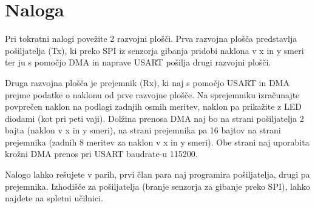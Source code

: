 \documentclass[12pt,letterpaper]{article}
\begin{document}
\section*{Naloga}

Pri tokratni nalogi povežite 2 razvojni plošči. Prva razvojna plošča predstavlja pošiljatelja (Tx), ki preko SPI iz senzorja gibanja pridobi naklona v x in y smeri ter ju s pomočjo DMA in naprave USART pošilja drugi razvojni plošči.

Druga razvojna plošča je prejemnik (Rx), ki naj s pomočjo USART in DMA prejme podatke o naklonu od prve razvojne plošče. Na sprejemniku izračunajte povprečen naklon na podlagi zadnjih osmih meritev, naklon pa prikažite z LED diodami (kot pri peti vaji). Dolžina prenosa DMA naj bo na strani pošiljatelja 2 bajta (naklon v x in y smeri), na strani prejemnika pa 16 bajtov na strani prejemnika (zadnih 8 meritev za naklon v x in y smeri). Obe strani naj uporabita krožni DMA prenos pri USART baudrate-u 115200.

Nalogo lahko rešujete v parih, prvi član para naj programira pošiljatelja, drugi pa prejemnika. Izhodišče za pošiljatelja (branje senzorja za gibanje preko SPI), lahko najdete na spletni učilnici.
\end{document}
